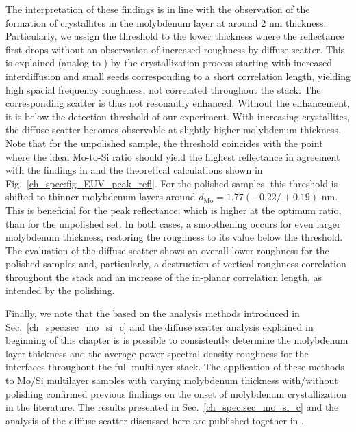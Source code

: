 The interpretation of these findings is in line with the observation of the formation of crystallites in the molybdenum layer \cite{bajt_investigation_2001} at around $2$ nm thickness. Particularly, we assign the threshold to the lower thickness where the reflectance first drops without an observation of increased roughness by diffuse scatter. This is explained (analog to \cite{bajt_investigation_2001}) by the crystallization  process starting with increased interdiffusion and small seeds corresponding to a short correlation length, yielding high spacial frequency roughness, not correlated throughout the stack. The corresponding scatter is thus not resonantly enhanced. Without the enhancement, it is below the detection threshold of our experiment. With increasing crystallites, the diffuse scatter becomes observable at slightly higher molybdenum thickness. Note that for the unpolished sample, the threshold coincides with the point where the ideal Mo-to-Si ratio should yield the highest reflectance in agreement with the findings in \cite{bajt_investigation_2001} and the theoretical calculations shown in Fig.~\ref{ch_spec:fig_EUV_peak_refl}. For the polished samples, this threshold is shifted to thinner molybdenum layers around $d_\text{Mo} = 1.77(-0.22/+0.19)$ nm. This is beneficial for the peak reflectance, which is higher at the optimum ratio, than for the unpolished set. In both cases, a smoothening occurs for even larger molybdenum thickness, restoring the roughness to its value below the threshold. The evaluation of the diffuse scatter shows an overall lower roughness for the polished samples and, particularly, a destruction of vertical roughness correlation throughout the stack and an increase of the in-planar correlation length, as intended by the polishing. 

Finally, we note that the based on the analysis methods introduced in Sec.~\ref{ch_spec:sec_mo_si_c} and the diffuse scatter analysis explained in beginning of this chapter is is possible to consistently determine the molybdenum layer thickness and the average power spectral density roughness for the interfaces throughout the full multilayer stack. The application of these methods to Mo/Si multilayer samples with varying molybdenum thickness with/without polishing confirmed previous findings on the onset of molybdenum crystallization in the literature. The results presented in Sec.~\ref{ch_spec:sec_mo_si_c} and the analysis of the diffuse scatter discussed here are published together in .

